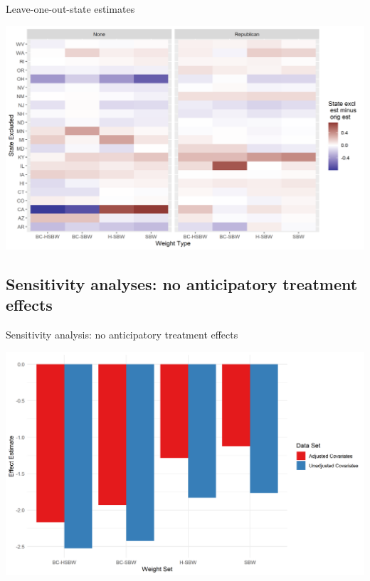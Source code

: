 \documentclass[hyperref={pdfpagelabels=false}]{beamer}
\begin{document}
\begin{frame}{Leave-one-out-state estimates}
    \begin{center}
	\includegraphics[scale=0.5]{01_Plots/c1-loostate-sensitivity.png}
    \end{center}
\end{frame}

\subsection{Sensitivity analyses: no anticipatory treatment effects}

\begin{frame}{Sensitivity analysis: no anticipatory treatment effects}
    \begin{center}
	\includegraphics[scale=0.5]{01_Plots/point-estimates-c2.png}
    \end{center}
\end{frame}
\end{document}
